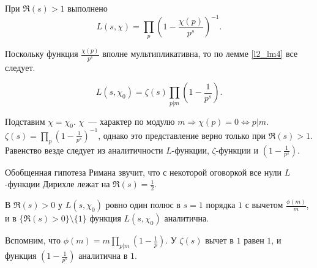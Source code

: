 \begin{lemma} \label{l7_Euler_ident}
	При $\Re(s) > 1$ выполнено
	$$L(s, \chi) = \prod_{p} \left(1 - \frac{\chi(p)}{p^s} \right)^{-1}.$$
\end{lemma}
\begin{pf}
	Поскольку функция $\displaystyle \frac{\chi(p)}{p^s}$ вполне мультипликативна, то по лемме \ref{l2_lm4} все следует.
\end{pf}

\begin{corollary} \label{l7_cor1}
	$$L(s, \chi_0) = \zeta(s) \prod_{p | m} \left( 1 - \frac{1}{p^s} \right).$$
\end{corollary}
\begin{pf}	
	Подставим $\chi = \chi_0$. $\chi$ — характер по модулю $m \Rightarrow \chi(p) = 0 \Leftrightarrow p | m$.
	$\displaystyle \zeta(s) = \prod_p  \left( 1 - \frac{1}{p^s} \right)^{-1}$, однако это представление верно только при
	$\Re(s) > 1$. Равенство везде следует из аналитичности $L$-функции, $\zeta$-функции и $\displaystyle \left(1 - \frac{1}{p^s} \right)$.
\end{pf}	

\begin{note}
	Обобщенная гипотеза Римана звучит, что с некоторой оговоркой все нули $L$-функции Дирихле лежат на
	$\displaystyle \Re(s) = \frac{1}{2}$.
\end{note}

\begin{corollary} \label{l7_col2}
	В $\Re(s) > 0$ у $L(s, \chi_0)$ ровно один полюс в $s = 1$ порядка $1$ с вычетом $\displaystyle \frac{\phi(m)}{m}$, и в $\lbrace \Re(s) > 0 \rbrace \setminus \lbrace{1\rbrace}$ функция $L(s, \chi_0)$ аналитична.
\end{corollary}
\begin{pf}
	Вспомним, что $\displaystyle \phi(m) = m \prod_{p | m} \left( 1 - \frac{1}{p} \right)$. У $\zeta(s)$ вычет в $1$ равен $1$, и функция $\displaystyle \left(1 - \frac{1}{p^s} \right)$ аналитична в $1$.
\end{pf}

